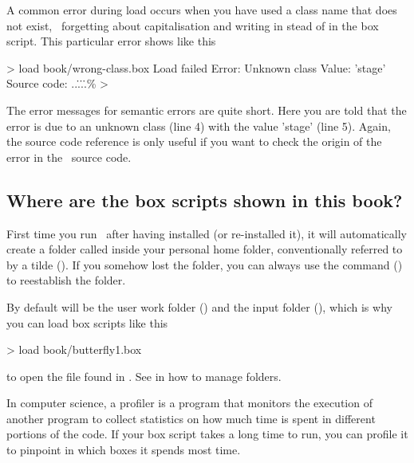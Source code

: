 A common error during load occurs when you have used a class name that does not exist, \eg\ forgetting about capitalisation and writing  in stead of  in the box script. This particular error shows like this

\lstset{numbers=left}
\begin{userror}
> load book/wrong-class.box
Load failed
Error: Unknown class
Value: 'stage'
Source code: ..\..\..\..\src\plugins\%\brk%
>
\end{userror}
\lstset{numbers=none}

The error messages for semantic errors are quite short. Here you are told that the error is due to an unknown class (line 4) with the value 'stage' (line 5). Again, the source code reference is only useful if you want to check the origin of the error in the \US\ source code.

\subsection{Where are the box scripts shown in this book?}
First time you run \US\ after having installed (or re-installed it), it will automatically create a folder called  inside your personal home folder, conventionally referred to by a tilde (\filename{\mytilde}). If you somehow lost the  folder, you can always use the  command () to reestablish the folder.

By default  will be the user work folder (\ushome) and  the input folder (), which is why you can load box scripts like this

\begin{usdialog}
> load book/butterfly1.box
\end{usdialog}

\noindent to open the file found in . See in  how to manage folders.


In computer science, a profiler is a program that monitors the execution of another program to collect statistics on how much time is spent in different portions of the code. If your box script takes a long time to run, you can profile it to pinpoint in which boxes it spends most time.

